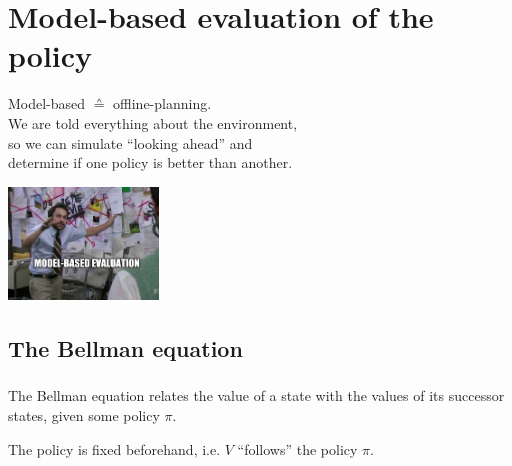 \section{Model-based evaluation of the policy}

\begin{frame} 
    \begin{center} 
    Model-based $\corresponds$ offline-planning.\\
    We are told everything about the environment,\\so we can simulate ``looking ahead'' and\\ determine if one policy is better than another.
    \end{center}
    
    \begin{center}
		\includegraphics[width=0.3\textwidth]{img/meme_model-based}
    \end{center}
\end{frame}

\subsection{The Bellman equation}

\begin{frame}\frametitle{\subsecname}

The Bellman equation relates the value of a state with the values of its successor states, given some policy $\pi$.

The policy is fixed beforehand, i.e. $V$ ``follows'' the policy $\pi$.

\end{frame}

